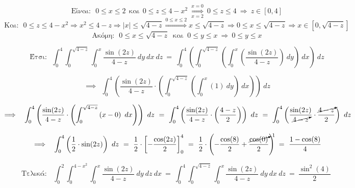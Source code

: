 \documentclass[fleqn]{article}
\begin{document}
\[
\text{Είναι:} \ \ \ 
0 \le x \le 2 \ \ \text{και} \ \ 0 \le z \le 4-x^2 \ \overset{x=0}{\underset{x=2}{\Rightarrow}} \ 0 \le z \le 4 \ \Rightarrow \ z \in [0,4]
\]
\vspace{-0.25cm}
\[
\text{Και:} \ \ \ 
0 \le z \le 4-x^2 \Rightarrow x^2 \le 4-z \Rightarrow |x| \le \sqrt{4-z} \overset{0 \le x \le 2}{\Rightarrow} x \le \sqrt{4-z} \Rightarrow 0 \le x \le \sqrt{4-z} \Rightarrow x \in [0, \sqrt{4-z}]
\]
\vspace{-0.25cm}
\[
\text{Ακόμη:} \ \ \ 
0 \le x \le \sqrt{4-z} \ \text{ και } \ 0 \le y \le x \ \Rightarrow \ 0 \le y \le x
\]

\vspace{0.1cm}
\[
\text{Έτσι:} \ \ \
\int_{0}^{4} \int_{0}^{\sqrt{4 - z}} \int_{0}^{x} \frac{\sin(2z)}{4 - z} \ dy \ dx \ dz
\ = \ 
\int_{0}^{4} \left( \int_{0}^{\sqrt{4 - z}} \left( \int_{0}^{x} \left( \frac{\sin(2z)}{4 - z} \right) \ dy \right) \ dx \right) \ dz
\]


\[
\implies \ \  \int_{0}^{4} \left( \frac{\sin(2z)}{4 - z} \cdot \left( \int_{0}^{\sqrt{4 - z}} \left( \int_{0}^{x} (1) \ dy \right) \ dx \right) \right) \ dz
\]

\[
\implies \ \  \int_{0}^{4} \left( \frac{\sin(2z)}{4 - z} \cdot \left( 
\int_{0}^{\sqrt{4 - z}} \left( x-0 \right) \ dx
\right) \right) \ dz
\ = \ 
\int_{0}^{4} \left( \frac{\sin(2z)}{4 - z} \cdot \left( 
\frac{4 - z}{2}
\right) \right) \ dz
\ = \ 
\int_{0}^{4} \left( \frac{\sin(2z)}{\cancelto{}{4 - z}} \cdot
\frac{\cancelto{}{4 - z}}{2}
 \right) \ dz
\]

\[
\implies \ \ 
\int_{0}^{4} \left( \frac{1}{2} \cdot \sin(2z) \right) \ dz 
\ = \ \frac{1}{2} \cdot \left[ -\frac{\cos(2z)}{2} \right]_0^4
\ = \ 
\frac{1}{2} \cdot \left( -\frac{\cos(8)}{2} + \frac{\cancelto{1}{\cos(0)}}{2} \right) 
\ = \
\frac{1 - \cos(8)}{4}
\] 

\[
\text{Τελικά:} \ \ \
\boxed{ \ \int_{0}^{2} \int_{0}^{4 - x^2} \int_{0}^{x} \frac{\sin(2z)}{4 - z} \ dy \ dz \ dx \ = \ \int_{0}^{4} \int_{0}^{\sqrt{4 - z}} \int_{0}^{x} \frac{\sin(2z)}{4 - z} \ dy \ dx \ dz \ = \ \frac{\sin^2(4)}{2} \ }
\]








\newpage





\begin{center}
\end{center}
\vspace{0.3cm} 
\end{document}
